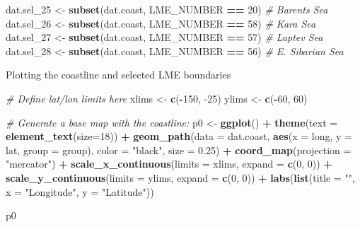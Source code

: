 \documentclass[12pt,]{article}
\newenvironment{Shaded}{\begin{snugshade}}{\end{snugshade}}
\newcommand{\CommentTok}[1]{\textcolor[rgb]{0.56,0.35,0.01}{\textit{#1}}}
\newcommand{\DataTypeTok}[1]{\textcolor[rgb]{0.13,0.29,0.53}{#1}}
\newcommand{\DecValTok}[1]{\textcolor[rgb]{0.00,0.00,0.81}{#1}}
\newcommand{\FloatTok}[1]{\textcolor[rgb]{0.00,0.00,0.81}{#1}}
\newcommand{\KeywordTok}[1]{\textcolor[rgb]{0.13,0.29,0.53}{\textbf{#1}}}
\newcommand{\NormalTok}[1]{#1}
\newcommand{\OperatorTok}[1]{\textcolor[rgb]{0.81,0.36,0.00}{\textbf{#1}}}
\newcommand{\StringTok}[1]{\textcolor[rgb]{0.31,0.60,0.02}{#1}}
\begin{document}
\begin{Shaded}
\begin{Highlighting}[]
\NormalTok{dat.sel_}\DecValTok{25}\NormalTok{ <-}\StringTok{ }\KeywordTok{subset}\NormalTok{(dat.coast, LME_NUMBER }\OperatorTok{==}\StringTok{ }\DecValTok{20}\NormalTok{) }\CommentTok{# Barents Sea}
\NormalTok{dat.sel_}\DecValTok{26}\NormalTok{ <-}\StringTok{ }\KeywordTok{subset}\NormalTok{(dat.coast, LME_NUMBER }\OperatorTok{==}\StringTok{ }\DecValTok{58}\NormalTok{) }\CommentTok{# Kara Sea}
\NormalTok{dat.sel_}\DecValTok{27}\NormalTok{ <-}\StringTok{ }\KeywordTok{subset}\NormalTok{(dat.coast, LME_NUMBER }\OperatorTok{==}\StringTok{ }\DecValTok{57}\NormalTok{) }\CommentTok{# Laptev Sea}
\NormalTok{dat.sel_}\DecValTok{28}\NormalTok{ <-}\StringTok{ }\KeywordTok{subset}\NormalTok{(dat.coast, LME_NUMBER }\OperatorTok{==}\StringTok{ }\DecValTok{56}\NormalTok{) }\CommentTok{# E. Sibarian Sea}
\end{Highlighting}
\end{Shaded}

Plotting the coastline and selected LME boundaries

\begin{Shaded}
\begin{Highlighting}[]
\CommentTok{# Define lat/lon limits here}
\NormalTok{xlims <-}\StringTok{ }\KeywordTok{c}\NormalTok{(}\OperatorTok{-}\DecValTok{150}\NormalTok{, }\DecValTok{-25}\NormalTok{)}
\NormalTok{ylims <-}\StringTok{ }\KeywordTok{c}\NormalTok{(}\OperatorTok{-}\DecValTok{60}\NormalTok{, }\DecValTok{60}\NormalTok{)}

\CommentTok{# Generate a base map with the coastline:}
\NormalTok{p0 <-}\StringTok{ }\KeywordTok{ggplot}\NormalTok{() }\OperatorTok{+}\StringTok{ }\KeywordTok{theme}\NormalTok{(}\DataTypeTok{text =} \KeywordTok{element_text}\NormalTok{(}\DataTypeTok{size=}\DecValTok{18}\NormalTok{)) }\OperatorTok{+}\StringTok{ }
\StringTok{  }\KeywordTok{geom_path}\NormalTok{(}\DataTypeTok{data =}\NormalTok{ dat.coast, }\KeywordTok{aes}\NormalTok{(}\DataTypeTok{x =}\NormalTok{ long, }\DataTypeTok{y =}\NormalTok{ lat, }\DataTypeTok{group =}\NormalTok{ group), }
            \DataTypeTok{color =} \StringTok{"black"}\NormalTok{, }\DataTypeTok{size =} \FloatTok{0.25}\NormalTok{) }\OperatorTok{+}\StringTok{ }
\StringTok{  }\KeywordTok{coord_map}\NormalTok{(}\DataTypeTok{projection =} \StringTok{"mercator"}\NormalTok{) }\OperatorTok{+}\StringTok{ }
\StringTok{  }\KeywordTok{scale_x_continuous}\NormalTok{(}\DataTypeTok{limits =}\NormalTok{ xlims, }\DataTypeTok{expand =} \KeywordTok{c}\NormalTok{(}\DecValTok{0}\NormalTok{, }\DecValTok{0}\NormalTok{)) }\OperatorTok{+}\StringTok{ }
\StringTok{  }\KeywordTok{scale_y_continuous}\NormalTok{(}\DataTypeTok{limits =}\NormalTok{ ylims, }\DataTypeTok{expand =} \KeywordTok{c}\NormalTok{(}\DecValTok{0}\NormalTok{, }\DecValTok{0}\NormalTok{)) }\OperatorTok{+}\StringTok{ }
\StringTok{  }\KeywordTok{labs}\NormalTok{(}\KeywordTok{list}\NormalTok{(}\DataTypeTok{title =} \StringTok{""}\NormalTok{, }\DataTypeTok{x =} \StringTok{"Longitude"}\NormalTok{, }\DataTypeTok{y =} \StringTok{"Latitude"}\NormalTok{))}

\NormalTok{p0}
\end{Highlighting}
\end{Shaded}
\end{document}
